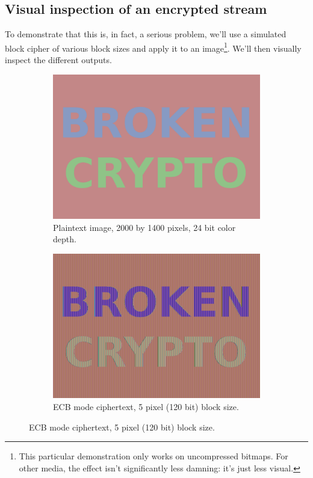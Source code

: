 \documentclass[11pt,ebook,table,dvipsnames]{memoir}
\begin{document}
\subsection{Visual inspection of an encrypted stream}
\label{sec-2-3-2-1}

To demonstrate that this is, in fact, a serious problem, we'll use a
simulated block cipher of various block sizes and apply it to an
image\footnote{This particular demonstration only works on uncompressed
bitmaps. For other media, the effect isn't significantly less damning:
it's just less visual.}. We'll then visually inspect the different
outputs.

\begin{figure}[p]
  \centering

  \begin{subfigure}[b]{.45\textwidth}
    \includegraphics[width=\textwidth]{./Illustrations/ECB/Plaintext.png}
    \caption{Plaintext image, 2000 by 1400 pixels, 24 bit color depth.}
    \label{fig:ECBDemoPlaintext}
  \end{subfigure}
  \quad
  \begin{subfigure}[b]{.45\textwidth}
    \includegraphics[width=\textwidth]{./Illustrations/ECB/Ciphertext5.png}
    \caption{ECB mode ciphertext, 5 pixel (120 bit) block size.}
    \label{fig:ECBDemo5px}
  \end{subfigure}


\end{figure}
\end{document}
